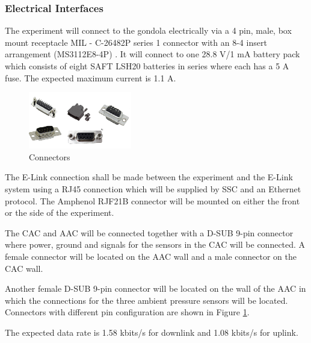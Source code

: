 \pagebreak
\subsubsection{Electrical Interfaces}
\label{sec:4.2.2}

The experiment will connect to the gondola electrically via a 4 pin, male, box mount receptacle MIL - C-26482P series 1 connector with an 8-4 insert arrangement (MS3112E8-4P) \cite{BexusManual}. It will connect to one 28.8 V/1 mA battery pack which consists of eight SAFT LSH20 batteries in series where each has a 5 A fuse\cite{BexusManual}. The expected maximum current is 1.1 A.

\begin{figure}[H]
    \centering
    \includegraphics[width=0.4\textwidth]{4-experiment-design/img/connectors.png}
    \caption{Connectors}
    \label{fig:connectors}
\end{figure}

The E-Link connection shall be made between the experiment and the E-Link system using a RJ45 connection which will be supplied by SSC and an Ethernet protocol. The Amphenol RJF21B connector will be mounted on either the front or the side of the experiment\cite{BexusManual}.  

The CAC and AAC will be connected together with a D-SUB 9-pin connector where power, ground and signals for the sensors in the CAC will be connected. A female connector will be located on the AAC wall and a male connector on the CAC wall.

Another female D-SUB 9-pin connector will be located on the wall of the AAC in which the connections for the three ambient pressure sensors will be located. Connectors with different pin configuration are shown in Figure \ref{fig:connectors}.

The expected data rate is 1.58 kbits/s for downlink and 1.08 kbits/s for uplink.

\raggedbottom